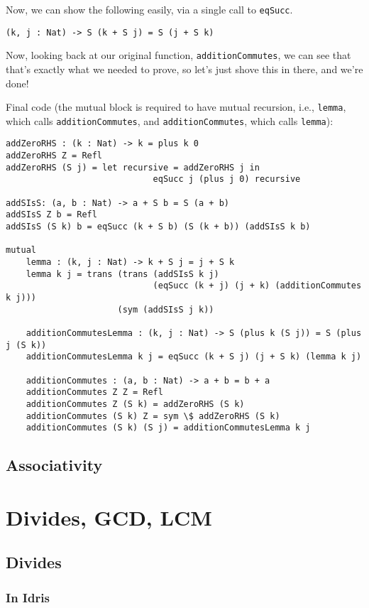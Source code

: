 \documentclass{article}
\newcommand{\inline}[1]{\texttt{#1}}
\begin{document}
Now, we can show the following easily, via a single call to \inline{eqSucc}.

\begin{verbatim}
(k, j : Nat) -> S (k + S j) = S (j + S k)
\end{verbatim}

Now, looking back at our original function, \inline{additionCommutes}, we can see that that’s exactly what we needed to prove, so let’s just shove this in there, and we’re done!

Final code (the mutual block is required to have mutual recursion, i.e., \inline{lemma}, which calls \inline{additionCommutes}, and \inline{additionCommutes}, which calls \inline{lemma}):

\begin{verbatim}
addZeroRHS : (k : Nat) -> k = plus k 0
addZeroRHS Z = Refl
addZeroRHS (S j) = let recursive = addZeroRHS j in
                             eqSucc j (plus j 0) recursive

addSIsS: (a, b : Nat) -> a + S b = S (a + b)
addSIsS Z b = Refl
addSIsS (S k) b = eqSucc (k + S b) (S (k + b)) (addSIsS k b)

mutual
    lemma : (k, j : Nat) -> k + S j = j + S k
    lemma k j = trans (trans (addSIsS k j)
                             (eqSucc (k + j) (j + k) (additionCommutes k j)))
                      (sym (addSIsS j k))

    additionCommutesLemma : (k, j : Nat) -> S (plus k (S j)) = S (plus j (S k))
    additionCommutesLemma k j = eqSucc (k + S j) (j + S k) (lemma k j)

    additionCommutes : (a, b : Nat) -> a + b = b + a
    additionCommutes Z Z = Refl
    additionCommutes Z (S k) = addZeroRHS (S k)
    additionCommutes (S k) Z = sym \$ addZeroRHS (S k)
    additionCommutes (S k) (S j) = additionCommutesLemma k j
\end{verbatim}

\subsection{Associativity}

\section{Divides, GCD, LCM}
\subsection{Divides}
\subsubsection{In Idris}
\end{document}
